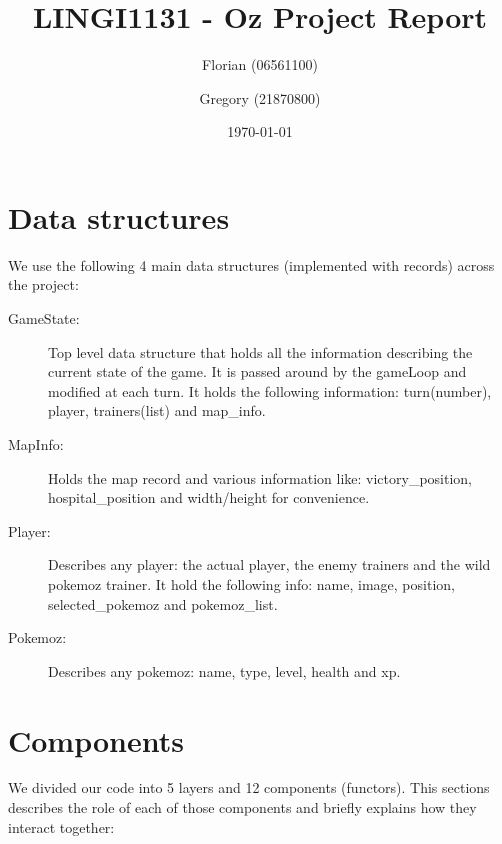 \documentclass[10pt, a4paper]{article}
\author{Florian \bsc{Thuin} (06561100) \and Gregory \bsc{Vander Schueren} (21870800)}
\title{LINGI1131 - Oz Project Report}
\date{\today}
\begin{document}
\maketitle

\section{Data structures}

We use the following 4 main data structures (implemented with records) across the project:

\begin{description}
  \item [GameState:] Top level data structure that holds all the information describing the current state of the game. It is passed around by the gameLoop and modified at each turn. It holds the following information: turn(number), player, trainers(list) and map\_info.
  \item [MapInfo:] Holds the map record and various information like: victory\_position, hospital\_position and width/height for convenience.
  \item [Player:] Describes any player: the actual player, the enemy trainers and the \og{}wild pokemoz\fg{} trainer. It hold the following info: name, image, position, selected\_pokemoz and pokemoz\_list.
  \item [Pokemoz:] Describes any pokemoz: name, type, level, health and xp.

\end{description}

\section{Components}

We divided our code into 5 layers and 12 \og{}components\fg{} (functors). This sections describes the role of each of those components and briefly explains how they interact together:
\end{document}
